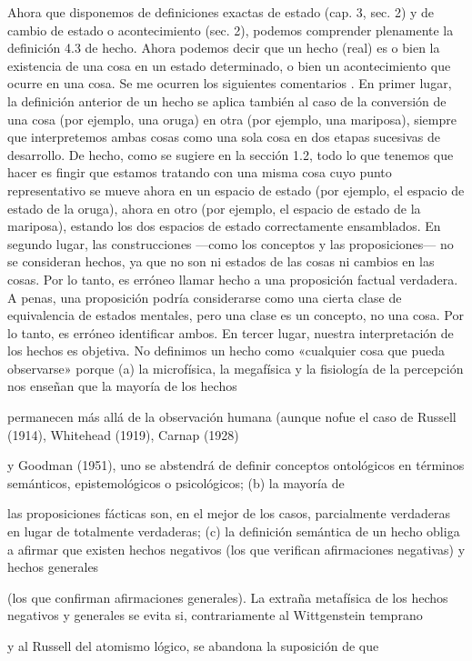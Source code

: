 \begin{justifying}
\begin{justifying}
Ahora que disponemos de definiciones exactas de estado (cap. 3, sec. 2) y de
cambio de estado o acontecimiento (sec. 2), podemos comprender plenamente la definición
4.3 de hecho. Ahora podemos decir que un hecho (real) es o bien la existencia de una cosa
en un estado determinado, o bien un acontecimiento que ocurre en una cosa. Se me ocurren los siguientes comentarios
.
En primer lugar, la definición anterior de un hecho se aplica también al caso de la
conversión de una cosa (por ejemplo, una oruga) en otra (por ejemplo, una mariposa),
siempre que interpretemos ambas cosas como una sola cosa en dos etapas sucesivas
de desarrollo. De hecho, como se sugiere en la sección 1.2, todo lo que tenemos que hacer
es fingir que estamos tratando con una misma cosa cuyo
punto representativo se mueve ahora en un espacio de estado (por ejemplo, el espacio de estado de la oruga),
 ahora en otro (por ejemplo, el espacio de estado de la mariposa), estando los dos espacios de estado
correctamente ensamblados.
En segundo lugar, las construcciones —como los conceptos y las proposiciones— no
se consideran hechos, ya que no son ni estados de las cosas ni cambios en
las cosas. Por lo tanto, es erróneo llamar hecho a una proposición factual verdadera. A
penas, una proposición podría considerarse como una cierta clase de equivalencia de
estados mentales, pero una clase es un concepto, no una cosa. Por lo tanto, es erróneo
identificar ambos.
En tercer lugar, nuestra interpretación de los hechos es objetiva. No definimos un hecho como
«cualquier cosa que pueda observarse» porque (a) la microfísica,
la megafísica y la fisiología de la percepción nos enseñan que la mayoría de los hechos

permanecen más allá de la observación humana (aunque nofue el caso de Russell (1914), Whitehead (1919), Carnap (1928)

y Goodman (1951), uno se abstendrá de definir conceptos ontológicos
en términos semánticos, epistemológicos o psicológicos; (b) la mayoría de

las proposiciones fácticas son, en el mejor de los casos, parcialmente verdaderas en lugar de totalmente verdaderas; (c)
la definición semántica de un hecho obliga a afirmar que existen
hechos negativos (los que verifican afirmaciones negativas) y hechos generales

(los que confirman afirmaciones generales). La extraña metafísica de los hechos negativos
y generales se evita si, contrariamente al Wittgenstein temprano

y al Russell del atomismo lógico, se abandona la suposición de que


\end{justifying}
\end{justifying}
